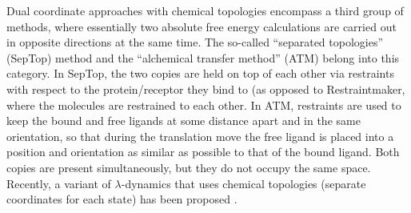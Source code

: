 \documentclass[9pt,bestpractices]{livecoms}
\begin{document}
Dual coordinate approaches with chemical topologies encompass a third group of methods, where essentially two absolute free energy calculations are carried out in opposite directions at the same time.
The so-called ``separated topologies'' (SepTop) method \cite{rocklin2013separated,Baumann_2023} and the ``alchemical transfer method'' (ATM) \cite{Azimi_2022} belong into this category. In SepTop, the two copies are held on top of each other via restraints with respect to the protein/receptor they bind to (as opposed to Restraintmaker, where the molecules are restrained to each other. %
In ATM, restraints are used to keep the bound and free ligands at some distance apart and in the same orientation, so that during the translation move the free ligand is placed into a position and orientation as similar as possible to that of the bound ligand. Both copies are present simultaneously, but they do not occupy the same space. Recently, a variant of $\lambda$-dynamics that uses chemical topologies (separate coordinates for each state) has been proposed \cite{Liesen_2024}.
  

\end{document}
